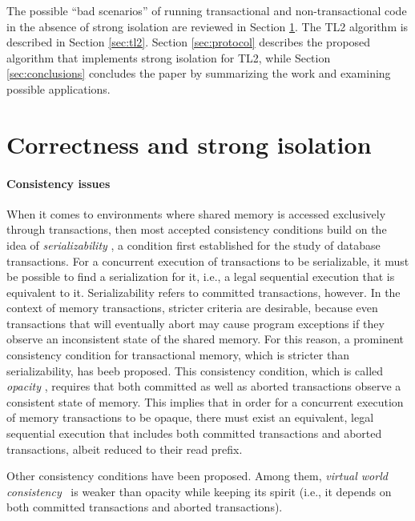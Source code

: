 \documentclass[11pt,letterpaper]{article}
\begin{document}
The  possible ``bad  scenarios''  of  running
transactional and non-transactional code in  
the absence of strong isolation are reviewed in Section 
\ref{sec:badthings}. The TL2 algorithm is described in Section \ref{sec:tl2}. 
Section \ref{sec:protocol} describes  the proposed algorithm that implements
strong isolation for TL2, while  
Section \ref{sec:conclusions}  concludes the paper by  summarizing the work
and examining possible applications.  





\section{Correctness and strong isolation}
\label{sec:badthings}

\paragraph{Consistency issues}
When it comes  to environments where shared memory  is accessed exclusively
through transactions, then most accepted  
consistency   conditions    build   on   the idea of   {\it serializability}
\cite{P79}, a condition first  
established  for  the study  of  database  transactions.  For a  concurrent
execution of transactions to be serializable, it must be  
possible to find a serialization for it, i.e., a legal sequential execution
that is equivalent to it.  Serializability refers to committed  
transactions,  however. In  the  context of  memory transactions,  stricter
criteria are desirable, because even transactions that  
will  eventually abort  may cause  program  exceptions if  they observe  an
inconsistent state of the shared memory.  For this  
reason, a  prominent consistency condition for  transactional memory, which
is stricter than serializability,  has beeb proposed. 
This  consistency condition, which is called {\it opacity}
\cite{guerraoui08},  requires   that  both
committed as well as aborted transactions  
observe a  consistent state  of memory.  This implies that  in order  for a
concurrent execution of memory transactions to be  
opaque,  there must exist  an equivalent,  legal sequential  execution that
includes both committed transactions and aborted  
transactions, albeit reduced to their read prefix.

Other consistency conditions have been proposed. Among them, 
{\it virtual world consistency}~\cite{IR09} is weaker than 
opacity while keeping its spirit (i.e., it depends on both committed 
transactions and aborted transactions). 
\end{document}
